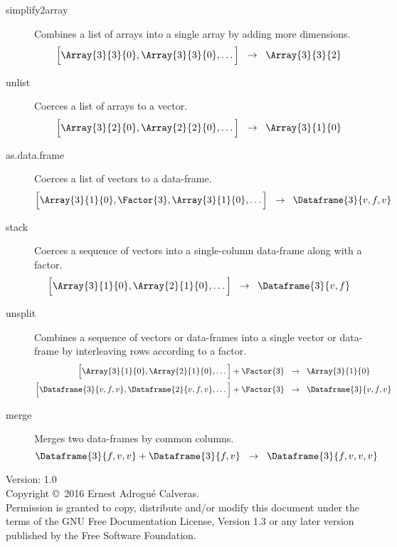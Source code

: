 \documentclass[a4paper,landscape]{article}
\newcommand{\Maps}{\;\;\rightarrow \;\;}
\begin{document}
\begin{multicols*}{3}
\begin{description}
\item[simplify2array] Combines a list of arrays into a single array by
  adding more dimensions.
  \[ \List{\Array{3}{3}{0},\Array{3}{3}{0},\dots} \Maps \Array{3}{3}{2} \]

\item[unlist] Coerces a list of arrays to a vector.
  \[ \List{\Array{3}{2}{0},\Array{2}{2}{0},\dots} \Maps \Array{3}{1}{0} \]

\item[as.data.frame] Coerces a list of vectors to a data-frame.
  \[
  \List{\Array{3}{1}{0},\Factor{3},\Array{3}{1}{0},\dots} \Maps
  \Dataframe{3}{v,f,v}
  \]

\item[stack] Coerces a sequence of vectors into a single-column data-frame
  along with a factor.
  \[ \List{\Array{3}{1}{0},\Array{2}{1}{0},\dots} \Maps \Dataframe{3}{v,f} \]

\item[unsplit] Combines a sequence of vectors or data-frames into a single
  vector or data-frame by interleaving rows according to a factor.
  \begin{align*}
    \List{\Array{3}{1}{0},\Array{2}{1}{0},\dots} + \Factor{3}
    &\Maps \Array{3}{1}{0} \\
    \List{\Dataframe{3}{v,f,v},\Dataframe{2}{v,f,v},\dots} + \Factor{3}
    &\Maps \Dataframe{3}{v,f,v}
  \end{align*}

\item[merge] Merges two data-frames by common columns.
  \[ \Dataframe{3}{f,v,v} + \Dataframe{3}{f,v} \Maps
  \Dataframe{3}{f,v,v,v} \]
\end{description}

\vfill
\vrule width3cm height.5pt

\scriptsize
Version: 1.0 \\
Copyright \copyright\ 2016 Ernest Adrogu\'e Calveras. \\
Permission is granted to copy, distribute and/or modify this document under
the terms of the GNU Free Documentation License, Version 1.3 or any later
version published by the Free Software Foundation.


\end{multicols*}
\end{document}
